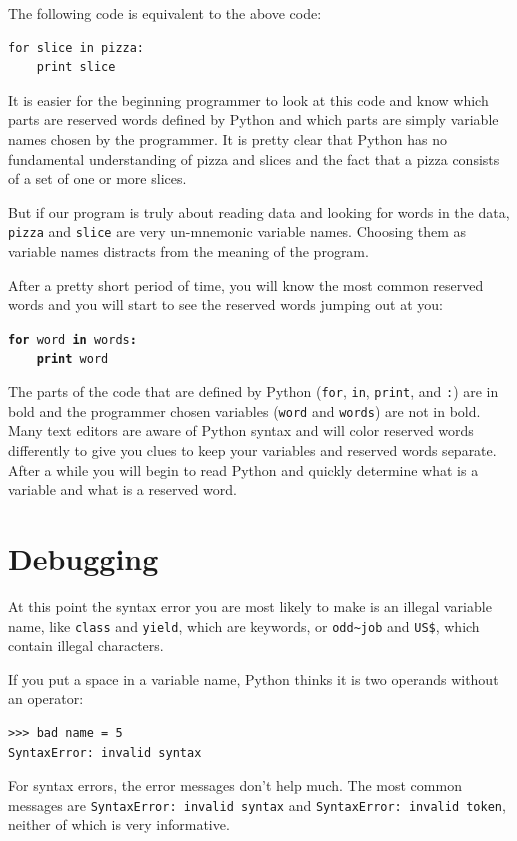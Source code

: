 \documentclass[10pt]{book}
\begin{document}
The following code is equivalent to the above code:

\beforeverb
\begin{verbatim}
for slice in pizza:
    print slice
\end{verbatim}
\afterverb
%
It is easier for the beginning programmer to look at this code and know which 
parts are reserved words defined by Python and which parts are simply variable
names chosen by the programmer.  It is pretty clear that Python has no fundamental
understanding of pizza and slices and the fact that a pizza consists of a set
of one or more slices.

But if our program is truly about reading data and looking for words in the data,
{\tt pizza} and {\tt slice} are very un-mnemonic variable names.  Choosing them 
as variable names distracts from the meaning of the program.

After a pretty short period of time, you will know the most common reserved words
and you will start to see the reserved words jumping out at you:

{\tt {\bf for} word {\bf in} words{\bf :}\\
\verb"    "{\bf print} word }

The parts of the code that are defined by 
Python ({\tt for}, {\tt in}, {\tt print}, and {\tt :}) are in bold
and the programmer chosen variables ({\tt word} and {\tt words}) are not in bold.  
Many text editors are aware of Python
syntax and will color reserved words differently to give you clues to keep 
your variables and reserved words separate.
After a while you will begin to read Python and quickly determine what
is a variable and what is a reserved word.

\section{Debugging}

At this point the syntax error you are most likely to make is
an illegal variable name, like {\tt class} and {\tt yield}, which
are keywords, or \verb"odd~job" and \verb"US$", which contain
illegal characters.


If you put a space in a variable name, Python thinks it is two
operands without an operator:

\beforeverb
\begin{verbatim}
>>> bad name = 5
SyntaxError: invalid syntax
\end{verbatim}
\afterverb
%
For syntax errors, the error messages don't help much.
The most common messages are {\tt SyntaxError: invalid syntax} and
{\tt SyntaxError: invalid token}, neither of which is very informative.
\end{document}
